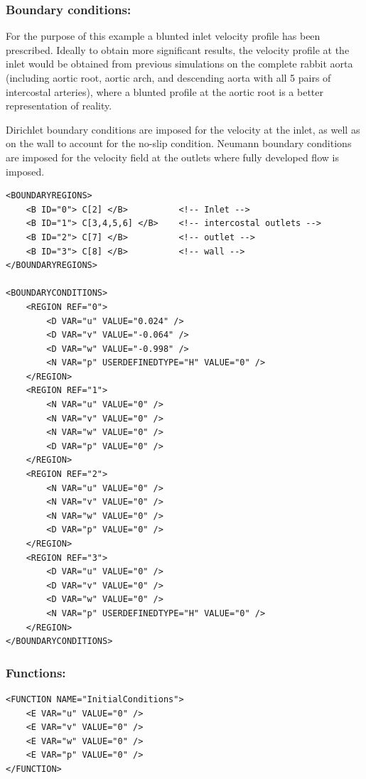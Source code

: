 \subsubsection{Boundary conditions:~} For the purpose of this example a blunted inlet velocity profile has been prescribed. Ideally to obtain more significant results, the velocity profile at the inlet would be obtained from previous simulations on the complete rabbit aorta (including aortic root, aortic arch, and descending aorta with all 5 pairs of intercostal arteries), where a blunted profile at the aortic root is a better representation of reality.

Dirichlet boundary conditions are imposed for the velocity at the inlet, as well as on the wall to account for the no-slip condition. Neumann boundary conditions are imposed for the velocity field at the outlets where fully developed flow is imposed.

\begin{lstlisting}[style=XMLStyle]
<BOUNDARYREGIONS>
    <B ID="0"> C[2] </B>          <!-- Inlet -->
    <B ID="1"> C[3,4,5,6] </B>    <!-- intercostal outlets -->
    <B ID="2"> C[7] </B>          <!-- outlet -->
    <B ID="3"> C[8] </B>          <!-- wall -->
</BOUNDARYREGIONS>

<BOUNDARYCONDITIONS>
    <REGION REF="0">
        <D VAR="u" VALUE="0.024" />
        <D VAR="v" VALUE="-0.064" />
        <D VAR="w" VALUE="-0.998" />
        <N VAR="p" USERDEFINEDTYPE="H" VALUE="0" />
    </REGION>
    <REGION REF="1">
        <N VAR="u" VALUE="0" />
        <N VAR="v" VALUE="0" />
        <N VAR="w" VALUE="0" />
        <D VAR="p" VALUE="0" />
    </REGION>
    <REGION REF="2">
        <N VAR="u" VALUE="0" />
        <N VAR="v" VALUE="0" />
        <N VAR="w" VALUE="0" />
        <D VAR="p" VALUE="0" />
    </REGION>
    <REGION REF="3">
        <D VAR="u" VALUE="0" />
        <D VAR="v" VALUE="0" />
        <D VAR="w" VALUE="0" />
        <N VAR="p" USERDEFINEDTYPE="H" VALUE="0" />
    </REGION>
</BOUNDARYCONDITIONS>
\end{lstlisting}

\subsubsection{Functions:~}
\begin{lstlisting}[style=XMLStyle]
<FUNCTION NAME="InitialConditions">
    <E VAR="u" VALUE="0" />
    <E VAR="v" VALUE="0" />
    <E VAR="w" VALUE="0" />
    <E VAR="p" VALUE="0" />
</FUNCTION>
\end{lstlisting}

